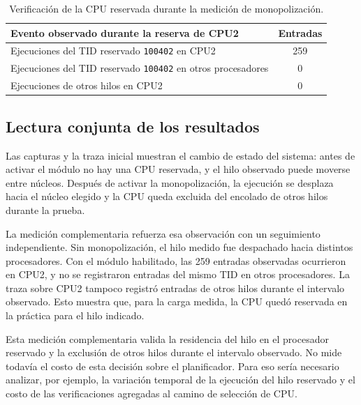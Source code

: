 \begin{table}[H]
    \centering
    \small
    \setlength{\tabcolsep}{5pt}
    \begin{tabular}{|>{\RaggedRight\arraybackslash}p{}|c|}
        \hline
        \textbf{Evento observado durante la reserva de CPU2} & \textbf{Entradas} \\
        \hline
        Ejecuciones del TID reservado \verb|100402| en CPU2 & 259 \\
        \hline
        Ejecuciones del TID reservado \verb|100402| en otros procesadores & 0 \\
        \hline
        Ejecuciones de otros hilos en CPU2 & 0 \\
        \hline
    \end{tabular}
    \caption{Verificación de la CPU reservada durante la medición de monopolización.}
    \label{tabla:dtrace-monopolizacion-reserva-cpu2}
\end{table}

\subsection{Lectura conjunta de los resultados}

Las capturas y la traza inicial muestran el cambio de estado del sistema: antes de activar el módulo no hay una CPU reservada, y el hilo observado puede moverse entre núcleos. Después de activar la monopolización, la ejecución se desplaza hacia el núcleo elegido y la CPU queda excluida del encolado de otros hilos durante la prueba.\par

La medición complementaria refuerza esa observación con un seguimiento independiente. Sin monopolización, el hilo medido fue despachado hacia distintos procesadores. Con el módulo habilitado, las 259 entradas observadas ocurrieron en CPU2, y no se registraron entradas del mismo TID en otros procesadores. La traza sobre CPU2 tampoco registró entradas de otros hilos durante el intervalo observado. Esto muestra que, para la carga medida, la CPU quedó reservada en la práctica para el hilo indicado.\par

Esta medición complementaria valida la residencia del hilo en el procesador reservado y la exclusión de otros hilos durante el intervalo observado. No mide todavía el costo de esta decisión sobre el planificador. Para eso sería necesario analizar, por ejemplo, la variación temporal de la ejecución del hilo reservado y el costo de las verificaciones agregadas al camino de selección de CPU.\par

